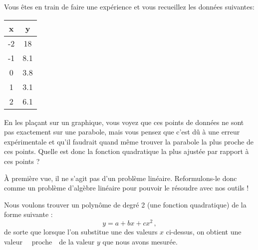 \begin{myprob} Vous êtes en train de faire une expérience et vous recueillez les données suivantes:

\begin{center}
\begin{tabular}{|c|c|}
\hline x & y \\
\hline 
-2 & 18 \\
-1 &  8.1 \\
0 & 3.8\\
1 & 3.1\\
2 & 6.1\\
\hline
\end{tabular}
\end{center}
En les plaçant sur un graphique, vous voyez que ces points de données ne sont pas exactement sur une parabole, mais vous pensez que c'est dû à une erreur expérimentale et qu'il faudrait quand même trouver la parabole la plus proche de ces points. Quelle est donc la fonction quadratique la plus ajustée par rapport \`a ces points ?

\begin{mysol} 
À première vue, il ne s'agit pas d'un problème linéaire.
Reformulons-le donc comme un problème d'algèbre linéaire pour pouvoir le résoudre avec nos outils !

Nous voulons trouver un polynôme de degr\'e 2 (une fonction quadratique) de la forme suivante :
$$
y = a + bx + cx^2\,,
$$
de sorte que lorsque l'on substitue une des valeurs $x$ ci-dessus, on obtient une valeur \ \og \ proche\ \fg\ 
de la valeur $y$ que nous avons mesurée.


\end{mysol}
\end{myprob}
